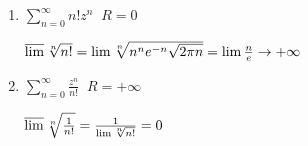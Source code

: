 \begin{example}\slashns
    
    \begin{enumerate}
        \item $\sum\limits_{n = 0}^{\infty} n!z^n \;\; R = 0$
        
        $\varlimsup \sqrt[n]{n!} = \lim \sqrt[n]{n^n e^{-n} \sqrt{2\pi n}} = \lim \frac{n}{e} \to +\infty$
        
        \item $\sum\limits_{n = 0}^{\infty} \frac{z^n}{n!} \;\; R = +\infty$
        
        $\varlimsup \sqrt[n]{\frac{1}{n!}} = \frac{1}{\lim \sqrt[n]{n!}} = 0$
        
    \end{enumerate}
\end{example}

